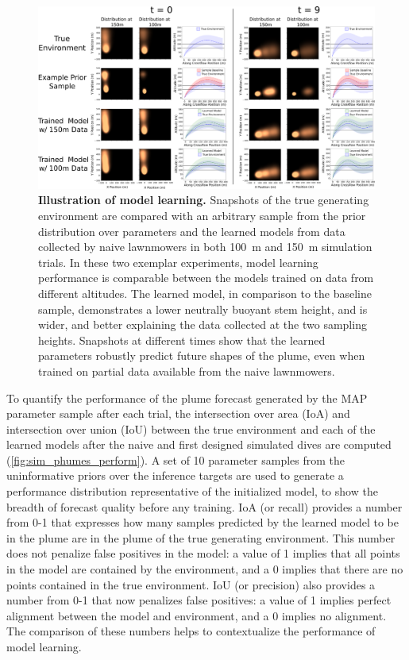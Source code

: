 \begin{figure}
    \centering
    \includegraphics[width=\columnwidth]{figures/sim_mod.png}
    \caption[Illustration of model learning.]{\textbf{Illustration of model learning.} Snapshots of the true generating environment are compared with an arbitrary sample from the prior distribution over \PHUMES parameters and the learned models from data collected by naive lawnmowers in both \SI{100}{\meter} and \SI{150}{\meter} simulation trials. In these two exemplar experiments, model learning performance is comparable between the \PHUMES models trained on data from different altitudes. The learned model, in comparison to the baseline sample, demonstrates a lower neutrally buoyant stem height, and is wider, and better explaining the data collected at the two sampling heights. Snapshots at different times show that the learned parameters robustly predict future shapes of the plume, even when trained on partial data available from the naive lawnmowers.}
    \label{fig:sim_model}
\end{figure}

To quantify the performance of the plume forecast generated by the MAP parameter sample after each trial, the intersection over area (IoA) and intersection over union (IoU) between the true environment and each of the learned models after the naive and first \PHORTEX designed simulated dives are computed (\cref{fig:sim_phumes_perform}). A set of 10 parameter samples from the uninformative priors over the inference targets are used to generate a performance distribution representative of the initialized model, to show the breadth of forecast quality before any training. IoA (or recall) provides a number from 0-1 that expresses how many samples predicted by the learned model to be in the plume are in the plume of the true generating environment. This number does not penalize false positives in the model: a value of 1 implies that all points in the model are contained by the environment, and a 0 implies that there are no points contained in the true environment. IoU (or precision) also provides a number from 0-1 that now penalizes false positives: a value of 1 implies perfect alignment between the model and environment, and a 0 implies no alignment. The comparison of these numbers helps to contextualize the performance of model learning. 

